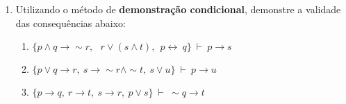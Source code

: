 \documentclass[12pt, a4paper,final]{article}
\begin{document}
\begin{enumerate}
\begin{enumerate}

\end{enumerate}


 \item Utilizando o m\'etodo de {\bf demonstra\c c\~ao condicional}, demonstre a validade das consequ\^encias abaixo:
 
\begin{enumerate}

\item $\{p \wedge q \rightarrow \sim r,\:\: ~ r \vee (s \wedge t),\:\: p \leftrightarrow ~ q \} ~\vdash~  p \rightarrow s $ 

\item $\{ p \vee q \rightarrow r,~ s \rightarrow \sim r \wedge \sim t,~ s \vee u \} ~\vdash~ p \rightarrow u$

\item $\{ p \rightarrow q,~ r \rightarrow t,~ s \rightarrow r,~ p \vee s \} ~\vdash~ \sim q \rightarrow t $















\end{enumerate}




\end{enumerate}
\end{document}
